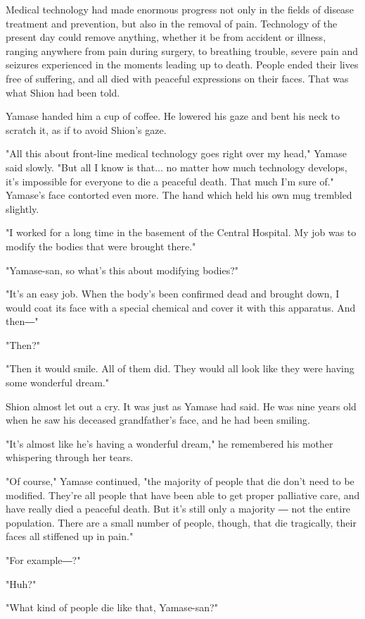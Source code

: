 Medical technology had made enormous progress not only in the fields of
disease treatment and prevention, but also in the removal of pain.
Technology of the present day could remove anything, whether it be from
accident or illness, ranging anywhere from pain during surgery, to
breathing trouble, severe pain and seizures experienced in the moments
leading up to death. People ended their lives free of suffering, and all
died with peaceful expressions on their faces. That was what Shion had
been told.

Yamase handed him a cup of coffee. He lowered his gaze and bent his neck
to scratch it, as if to avoid Shion's gaze.

"All this about front-line medical technology goes right over my head,"
Yamase said slowly. "But all I know is that... no matter how much
technology develops, it's impossible for everyone to die a peaceful
death. That much I'm sure of." Yamase's face contorted even more. The
hand which held his own mug trembled slightly.

"I worked for a long time in the basement of the Central Hospital. My
job was to modify the bodies that were brought there."

"Yamase-san, so what's this about modifying bodies?"

"It's an easy job. When the body's been confirmed dead and brought down,
I would coat its face with a special chemical and cover it with this
apparatus. And then―"

"Then?"

"Then it would smile. All of them did. They would all look like they
were having some wonderful dream."

Shion almost let out a cry. It was just as Yamase had said. He was nine
years old when he saw his deceased grandfather's face, and he had been
smiling.

"It's almost like he's having a wonderful dream," he remembered his
mother whispering through her tears.

"Of course," Yamase continued, "the majority of people that die don't
need to be modified. They're all people that have been able to get
proper palliative care, and have really died a peaceful death. But it's
still only a majority ― not the entire population. There are a small
number of people, though, that die tragically, their faces all stiffened
up in pain."

"For example―?"

"Huh?"

"What kind of people die like that, Yamase-san?"

